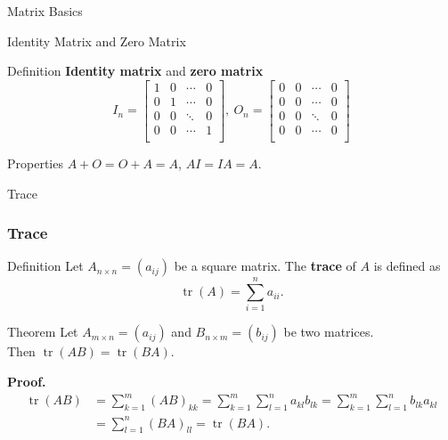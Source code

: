 \documentclass{beamer}
\begin{document}
\begin{section}{Matrix Basics}
    

\begin{frame}[label=4]{Identity Matrix and Zero Matrix}
        \begin{block}{Definition} 
        \textbf{Identity matrix} and \textbf{zero matrix}
        \begin{equation*}
            I_n = \left[ 
                \begin{array}{cccc}
                    1 & 0 & \cdots & 0 \\ 
                    0 & 1 & \cdots & 0 \\ 
                    0 & 0 & \ddots & 0 \\ 
                    0 & 0 & \cdots & 1 \\
                \end{array}
            \right], \ O_n = \left[ 
                \begin{array}{cccc}
                    0 & 0 & \cdots & 0 \\ 
                    0 & 0 & \cdots & 0 \\ 
                    0 & 0 & \ddots & 0 \\ 
                    0 & 0 & \cdots & 0 \\
                \end{array}
            \right]
        \end{equation*}
        \end{block}
        
        \begin{block}{Properties} 
        $A + O = O + A = A$, $AI = IA = A$. 
        \end{block}
\end{frame}
    
\begin{frame}[label=5]{Trace}
        \frametitle{Trace}
        \begin{block}{Definition} 
        Let $A_{n\times n} = (a_{ij})$ be a square matrix. The \textbf{trace} of $A$ is defined as 
        \begin{equation*}
            \operatorname{tr}(A) = \sum\limits_{i=1}^{n} a_{ii}.
        \end{equation*}
        
        \end{block}

        \begin{block}{Theorem} 
        Let $A_{m \times n} = (a_{ij})$ and $B_{n \times m} = (b_{ij})$ be two matrices. \\
        Then $\operatorname{tr}(AB) = \operatorname{tr}(BA)$. 
        \end{block}
        \pause 
        \textbf{Proof.} 
        \begin{align*}
            \operatorname{tr}(AB) &= \sum\limits_{k=1}^{m} (AB)_{kk} = \sum\limits_{k=1}^{m} \sum\limits_{l=1}^{n} a_{kl} b_{lk} = \sum\limits_{k=1}^{m} \sum\limits_{l=1}^{n} b_{lk} a_{kl} \\
            & = \sum\limits_{l=1}^{n} (BA)_{ll} = \operatorname{tr}(BA). 
        \end{align*}
\end{frame}


\end{section}
\end{document}

